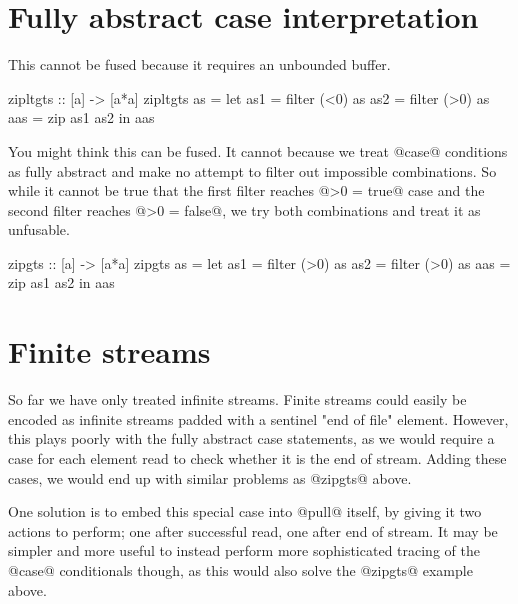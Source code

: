 \section{Fully abstract case interpretation}

This cannot be fused because it requires an unbounded buffer.
\begin{code}
zipltgts :: [a] -> [a*a]
zipltgts as =
  let as1 = filter (<0) as
      as2 = filter (>0) as
      aas = zip as1 as2
  in  aas
\end{code}

You might think this can be fused.
It cannot because we treat @case@ conditions as fully abstract and make no attempt to filter out impossible combinations.
So while it cannot be true that the first filter reaches @>0 = true@ case and the second filter reaches @>0 = false@, we try both combinations and treat it as unfusable.
\begin{code}
zipgts :: [a] -> [a*a]
zipgts as =
  let as1 = filter (>0) as
      as2 = filter (>0) as
      aas = zip as1 as2
  in  aas
\end{code}

\section{Finite streams}
So far we have only treated infinite streams.
Finite streams could easily be encoded as infinite streams padded with a sentinel "end of file" element.
However, this plays poorly with the fully abstract case statements, as we would require a case for each element read to check whether it is the end of stream.
Adding these cases, we would end up with similar problems as @zipgts@ above.

One solution is to embed this special case into @pull@ itself, by giving it two actions to perform; one after successful read, one after end of stream.
It may be simpler and more useful to instead perform more sophisticated tracing of the @case@ conditionals though, as this would also solve the @zipgts@ example above.



